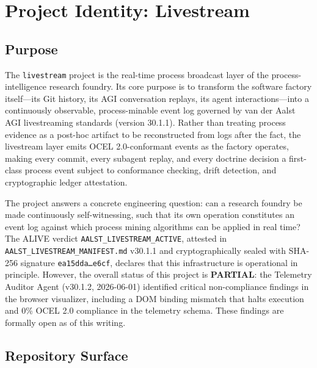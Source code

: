 
\section{Project Identity: Livestream}
\label{sec:livestream-identity}

\subsection{Purpose}
\label{sec:livestream-identity-purpose}

The \texttt{livestream} project is the real-time process broadcast layer of the
process-intelligence research foundry. Its core purpose is to transform the software
factory itself---its Git history, its AGI conversation replays, its agent
interactions---into a continuously observable, process-minable event log governed
by van der Aalst AGI livestreaming standards (version 30.1.1). Rather than treating
process evidence as a post-hoc artifact to be reconstructed from logs after the fact,
the livestream layer emits OCEL 2.0-conformant events as the factory operates,
making every commit, every subagent replay, and every doctrine decision a first-class
process event subject to conformance checking, drift detection, and cryptographic
ledger attestation.

The project answers a concrete engineering question: can a research foundry be made
continuously self-witnessing, such that its own operation constitutes an event log
against which process mining algorithms can be applied in real time? The ALIVE verdict
\texttt{AALST\_LIVESTREAM\_ACTIVE}, attested in \texttt{AALST\_LIVESTREAM\_MANIFEST.md}
v30.1.1 and cryptographically sealed with SHA-256 signature
\texttt{ea15dda\ldots{}e6cf}, declares that this infrastructure is operational
in principle. However, the overall status of this project is \textbf{PARTIAL}: the
Telemetry Auditor Agent (v30.1.2, 2026-06-01) identified critical non-compliance
findings in the browser visualizer, including a DOM binding mismatch that halts
execution and 0\% OCEL 2.0 compliance in the telemetry schema. These findings
are formally open as of this writing.

\subsection{Repository Surface}
\label{sec:livestream-identity-repo}

